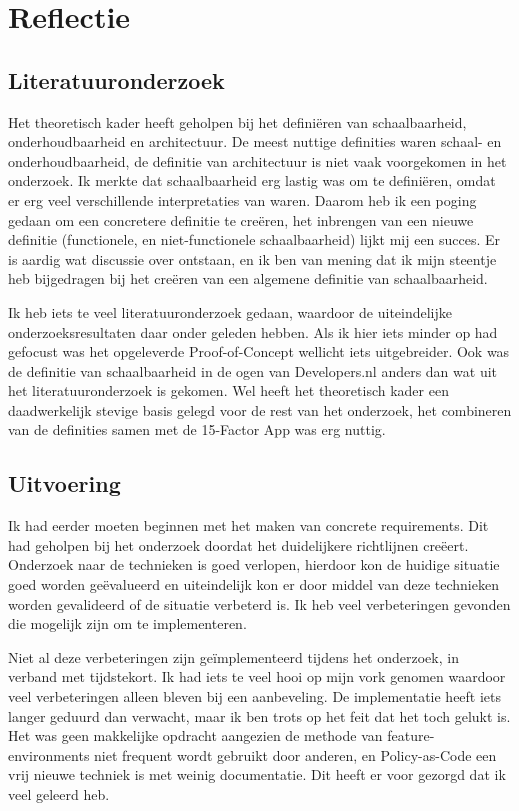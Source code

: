 \chapter{Reflectie}

\label{Reflectie}

\section{Literatuuronderzoek}
Het theoretisch kader heeft geholpen bij het definiëren van schaalbaarheid, onderhoudbaarheid en architectuur. De meest nuttige definities waren schaal- en onderhoudbaarheid, de definitie van architectuur is niet vaak voorgekomen in het onderzoek. Ik merkte dat schaalbaarheid erg lastig was om te definiëren, omdat er erg veel verschillende interpretaties van waren. Daarom heb ik een poging gedaan om een concretere definitie te creëren, het inbrengen van een nieuwe definitie (functionele, en niet-functionele schaalbaarheid) lijkt mij een succes. Er is aardig wat discussie over ontstaan, en ik ben van mening dat ik mijn steentje heb bijgedragen bij het creëren van een algemene definitie van schaalbaarheid.

Ik heb iets te veel literatuuronderzoek gedaan, waardoor de uiteindelijke onderzoeksresultaten daar onder geleden hebben. Als ik hier iets minder op had gefocust was het opgeleverde Proof-of-Concept wellicht iets uitgebreider. Ook was de definitie van schaalbaarheid in de ogen van Developers.nl anders dan wat uit het literatuuronderzoek is gekomen. Wel heeft het theoretisch kader een daadwerkelijk stevige basis gelegd voor de rest van het onderzoek, het combineren van de definities samen met de 15-Factor App was erg nuttig.

\section{Uitvoering}
Ik had eerder moeten beginnen met het maken van concrete requirements. Dit had geholpen bij het onderzoek doordat het duidelijkere richtlijnen creëert. Onderzoek naar de technieken is goed verlopen, hierdoor kon de huidige situatie goed worden geëvalueerd en uiteindelijk kon er door middel van deze technieken worden gevalideerd of de situatie verbeterd is. Ik heb veel verbeteringen gevonden die mogelijk zijn om te implementeren. 

Niet al deze verbeteringen zijn geïmplementeerd tijdens het onderzoek, in verband met tijdstekort. Ik had iets te veel hooi op mijn vork genomen waardoor veel verbeteringen alleen bleven bij een aanbeveling. De implementatie heeft iets langer geduurd dan verwacht, maar ik ben trots op het feit dat het toch gelukt is. Het was geen makkelijke opdracht aangezien de methode van feature-environments niet frequent wordt gebruikt door anderen, en Policy-as-Code een vrij nieuwe techniek is met weinig documentatie. Dit heeft er voor gezorgd dat ik veel geleerd heb.

